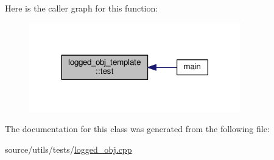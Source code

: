 Here is the caller graph for this function\-:
\nopagebreak
\begin{figure}[H]
\begin{center}
\leavevmode
\includegraphics[width=260pt]{classlogged__obj__template_ab1b1cf9ed29eb291f0c67a4d8b9f1827_icgraph}
\end{center}
\end{figure}




The documentation for this class was generated from the following file\-:\begin{DoxyCompactItemize}
\item 
source/utils/tests/\hyperlink{logged__obj_8cpp}{logged\-\_\-obj.\-cpp}\end{DoxyCompactItemize}
